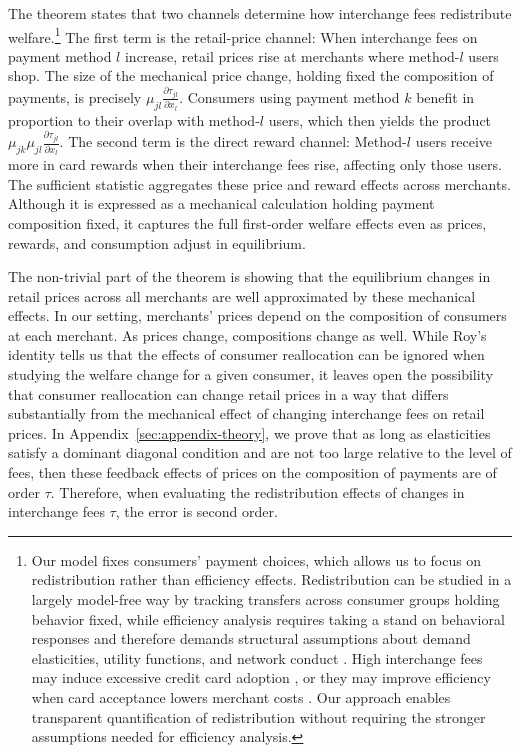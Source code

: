 \documentclass[11pt,english]{article}
\theoremstyle{remark}
\begin{document}
The theorem states that two channels determine how interchange fees redistribute welfare.\footnote{Our model fixes consumers' payment choices, which allows us to focus on redistribution rather than efficiency effects.
Redistribution can be studied in a largely model-free way by tracking transfers across consumer groups holding behavior fixed, while efficiency analysis requires taking a stand on behavioral responses and therefore demands structural assumptions about demand elasticities, utility functions, and network conduct \citep{Wang2025}.
High interchange fees may induce excessive credit card adoption \citep{Wang2025}, or they may improve efficiency when card acceptance lowers merchant costs \citep{Li.etal2020}.
Our approach enables transparent quantification of redistribution without requiring the stronger assumptions needed for efficiency analysis.}
The first term is the retail-price channel: When interchange fees on payment method $l$ increase, retail prices rise at merchants where method-$l$ users shop.
The size of the mechanical price change, holding fixed the composition of payments, is precisely $\mu_{jl} \frac{\partial \tau_{jl}}{\partial x_l}$.
Consumers using payment method $k$ benefit in proportion to their overlap with method-$l$ users, which then yields the product $\mu_{jk}\mu_{jl} \frac{\partial \tau_{jl}}{\partial x_l}$.
The second term is the direct reward channel: Method-$l$ users receive more in card rewards when their interchange fees rise, affecting only those users.
The sufficient statistic aggregates these price and reward effects across merchants.
Although it is expressed as a mechanical calculation holding payment composition fixed, it captures the full first-order welfare effects even as prices, rewards, and consumption adjust in equilibrium.

The non-trivial part of the theorem is showing that the equilibrium changes in retail prices across all merchants are well approximated by these mechanical effects.
In our setting, merchants' prices depend on the composition of consumers at each merchant.
As prices change, compositions change as well.
While Roy's identity tells us that the effects of consumer reallocation can be ignored when studying the welfare change for a given consumer, it leaves open the possibility that consumer reallocation can change retail prices in a way that differs substantially from the mechanical effect of changing interchange fees on retail prices.
In Appendix~\ref{sec:appendix-theory}, we prove that as long as elasticities satisfy a dominant diagonal condition and are not too large relative to the level of fees, then these feedback effects of prices on the composition of payments are of order $\tau$.
Therefore, when evaluating the redistribution effects of changes in interchange fees $\tau$, the error is second order.
\end{document}
